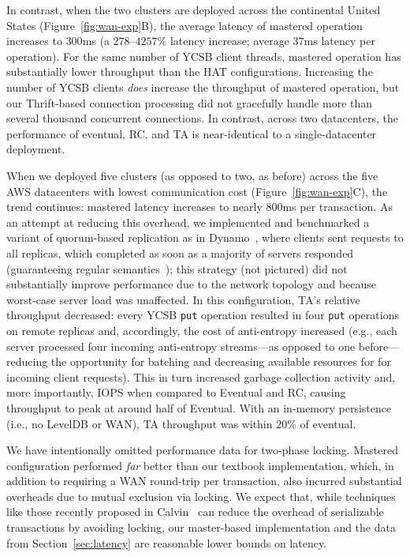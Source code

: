  In contrast, when the two clusters are deployed across the
 continental United States (Figure~\ref{fig:wan-exp}B), the average
 latency of mastered operation increases to $300$ms (a $278$--$4257\%$
 latency increase; average $37$ms latency per operation). For the same
 number of YCSB client threads, mastered operation has substantially
 lower throughput than the HAT configurations. Increasing the number of YCSB
 clients \textit{does} increase the throughput of mastered operation,
 but our Thrift-based connection processing did not gracefully handle
 more than several thousand concurrent connections. In contrast,
 across two datacenters, the performance of eventual, RC, and TA is
 near-identical to a single-datacenter deployment.

When we deployed five clusters (as opposed to two, as before) across
the five AWS datacenters with lowest communication cost
(Figure~\ref{fig:wan-exp}C), the trend continues: mastered latency
increases to nearly $800$ms per transaction. As an attempt at reducing
this overhead, we implemented and benchmarked a variant of
quorum-based replication as in Dynamo~\cite{dynamo}, where clients
sent requests to all replicas, which completed as soon as a majority
of servers responded (guaranteeing regular
semantics~\cite{herlihy-art}); this strategy (not pictured) did not
substantially improve performance due to the network topology and
because worst-case server load was unaffected. In this configuration,
TA's relative throughput decreased: every YCSB \texttt{put} operation
resulted in four \texttt{put} operations on remote replicas and,
accordingly, the cost of anti-entropy increased (e.g., each server
processed four incoming anti-entropy streams---as opposed to one
before---reducing the opportunity for batching and decreasing
available resources for for incoming client requests). This in turn
increased garbage collection activity and, more importantly, IOPS when
compared to Eventual and RC, causing throughput to peak at around half
of Eventual. With an in-memory persistence (i.e., no LevelDB or WAN),
TA throughput was within 20\% of eventual.

We have intentionally omitted performance data for two-phase
locking. Mastered configuration performed \textit{far} better than our
textbook implementation, which, in addition to requiring a WAN
round-trip per transaction, also incurred substantial overheads due to
mutual exclusion via locking. We expect that, while techniques like
those recently proposed in Calvin~\cite{calvin} can reduce the
overhead of serializable transactions by avoiding locking, our
master-based implementation and the data from
Section~\ref{sec:latency} are reasonable lower bounds on latency.

